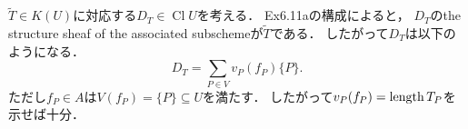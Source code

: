 \documentclass[a4paper]{jsarticle}
\newcommand{\Cl}{\operatorname{Cl}}
\begin{document}

    $\tilde{T} \in K(U)$に対応する$D_T \in \Cl U$を考える．
    Ex6.11aの構成によると，
    $D_T$のthe structure sheaf of the associated subschemeが$\tilde{T}$である．
    したがって$D_T$は以下のようになる．
    \[ D_T=\sum_{P \in V} v_P(f_P) \{P\}. \]
    ただし$f_P \in A$は$V(f_P)=\{P\} \subseteq U$を満たす．
    したがって$v_P(f_P)=\operatorname{length} T_P$を示せば十分．
\end{document}
